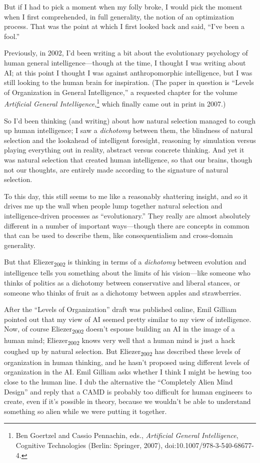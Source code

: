 {
 But if I had to pick a moment when my folly broke, I would pick
the moment when I first comprehended, in full generality, the notion of
an optimization process. That was the point at which I first looked
back and said, ``I've been a
fool.''}

{
 Previously, in 2002, I'd been writing a bit about
the evolutionary psychology of human general intelligence---though at
the time, I thought I was writing about AI; at this point I thought I
was against anthropomorphic intelligence, but I was still looking to
the human brain for inspiration. (The paper in question is
``Levels of Organization in General
Intelligence,'' a requested chapter for the volume
\textit{Artificial General Intelligence},\footnote{Ben Goertzel and Cassio Pennachin, eds., \textit{Artificial
General Intelligence}, Cognitive Technologies (Berlin: Springer, 2007),
doi:10.1007/978-3-540-68677-4.} which
finally came out in print in 2007.)}

{
 So I'd been thinking (and writing) about how
natural selection managed to cough up human intelligence; I saw a
\textit{dichotomy} between them, the blindness of natural selection and
the lookahead of intelligent foresight, reasoning by simulation versus
playing everything out in reality, abstract versus concrete thinking.
And yet it was natural selection that created human intelligence, so
that our brains, though not our thoughts, are entirely made according
to the signature of natural selection.}

{
 To this day, this still seems to me like a reasonably shattering
insight, and so it drives me up the wall when people lump together
natural selection and intelligence-driven processes as
``evolutionary.'' They really are
almost absolutely different in a number of important ways---though
there are concepts in common that can be used to describe them, like
consequentialism and cross-domain generality.}

{
 But that Eliezer\textsubscript{2002} is thinking in terms of a
\textit{dichotomy} between evolution and intelligence tells you
something about the limits of his vision---like someone who thinks of
politics as a dichotomy between conservative and liberal stances, or
someone who thinks of fruit as a dichotomy between apples and
strawberries.}

{
 After the ``Levels of
Organization'' draft was published online, Emil
Gilliam pointed out that my view of AI seemed pretty similar to my view
of intelligence. Now, of course Eliezer\textsubscript{2002}
doesn't espouse building an AI in the image of a human
mind; Eliezer\textsubscript{2002} knows very well that a human mind is
just a hack coughed up by natural selection. But
Eliezer\textsubscript{2002} has described these levels of organization
in human thinking, and he hasn't proposed using
different levels of organization in the AI. Emil Gilliam asks whether I
think I might be hewing too close to the human line. I dub the
alternative the ``Completely Alien Mind
Design'' and reply that a CAMD is probably too
difficult for human engineers to create, even if it's
possible in theory, because we wouldn't be able to
understand something so alien while we were putting it together.}


